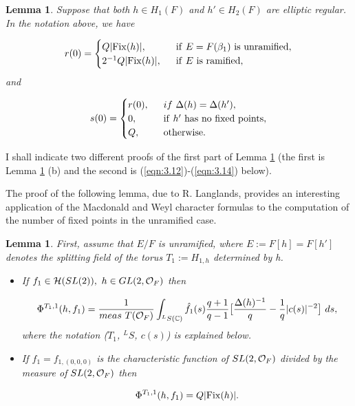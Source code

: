 \documentclass[12pt,letterpaper]{article}
\newtheorem{lemma}[theorem]{Lemma}
\def\hhh{{\cal H}}
\def\ccc{\mathbb{C}}
\def\off{{\cal O}_F}
\begin{document}
\begin{lemma}
\label{lemma:3.3} 
Suppose that both $h\in H_1(F)$ and $h'\in H_2(F)$
are elliptic regular. In the notation above, we have

\[
r(0)=
\begin{cases} 
Q|{\rm Fix}(h)|,&\ \ {\rm if}\ E=F(\beta_1) \ {\rm is\ unramified},\\
2^{-1}Q|{\rm Fix} (h)|,&\ \ {\rm if}\ E\ {\rm is\ ramified},
\end{cases} 
\]
and

\[
s(0)=
\begin{cases} 
r(0),&\ \ { if }\ \Delta (h)=\Delta (h'),\\
0,&\ \ {\rm if}\  h'\ {\rm has\ no\ fixed\ points},\\
Q,& \ \ {\rm otherwise}.
\end{cases} 
\]
\end{lemma}
 
I shall indicate two different proofs of the first part of 
Lemma \ref{lemma:3.3}
(the first is Lemma \ref{lemma:3.4} (b) and the second is 
(\ref{eqn:3.12})-(\ref{eqn:3.14}) below).
 
The proof
of the following lemma, due to R. Langlands, provides an interesting
application of the Macdonald and Weyl character formulas to the computation of
the number of fixed points in the unramified case.

\begin{lemma}
\label{lemma:3.4} 
First, assume that $E/F$ is unramified, 
where $E:=F[h]=F[h']$ denotes the splitting
field of the torus $T_1:=H_{1,h}$ determined by h. 

\begin{itemize}

\item[(a)] 
If $f_1\in \hhh (SL(2)),\ h\in GL(2,\off )$ then

\[
\Phi^{T_1,1}(h,f_1) = {1\over{meas\ T(\off )}}\int_{^{L}S(\ccc )}
\hat{f_1}(s){q+1\over{q-1}}\big[ {\Delta (h)^{-1}\over{q}}
-{1\over{q}}|c(s)|^{-2}\big]\ ds,
\]
where the notation ($T_1$, $^LS$, $c(s)$) is explained below.

\item[(b)] 
If $f_1 =f_{1,(0,0,0)}$ is the characteristic function of $SL(2,\off )$
divided by the measure of $SL(2,\off )$ then

\[
\Phi^{T_1,1}(h,f_1)=Q|{\rm Fix} (h)|.
\]
\end{itemize}
\end{lemma}
\end{document}

